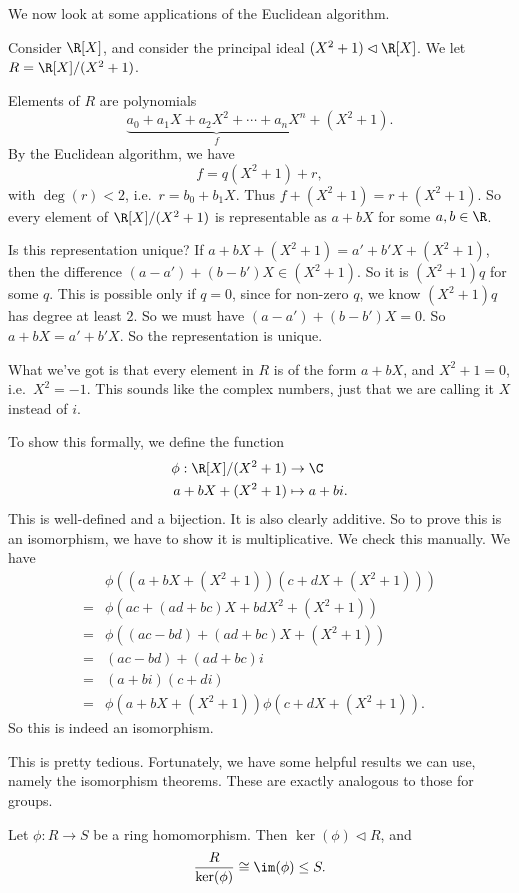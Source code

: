 \documentclass[a4paper]{article}
\begin{document}
We now look at some applications of the Euclidean algorithm.
\begin{eg}
  Consider $\R[X]$, and consider the principal ideal $(X^2 + 1) \lhd \R[X]$. We let $R = \R[X]/(X^2 + 1)$.

  Elements of $R$ are polynomials
  \[
    \underbrace{a_0 + a_1X + a_2 X^2 + \cdots + a_n X^n}_{f} + (X^2 + 1).
  \]
  By the Euclidean algorithm, we have
  \[
    f = q(X^2 + 1) + r,
  \]
  with $\deg(r) < 2$, i.e.\ $r = b_0 + b_1 X$. Thus $f + (X^2 + 1) = r + (X^2 + 1)$. So every element of $\R[X]/(X^2 + 1)$ is representable as $a + bX$ for some $a, b \in \R$.

  Is this representation unique? If $a + bX + (X^2 + 1) = a' + b' X + (X^2 + 1)$, then the difference $(a - a') + (b - b')X \in (X^2 + 1)$. So it is $(X^2 + 1)q$ for some $q$. This is possible only if $q = 0$, since for non-zero $q$, we know $(X^2 + 1)q$ has degree at least $2$. So we must have $(a - a') + (b - b')X = 0$. So $a + bX = a' + b'X$. So the representation is unique.

  What we've got is that every element in $R$ is of the form $a + bX$, and $X^2 + 1 = 0$, i.e.\ $X^2 = -1$. This sounds like the complex numbers, just that we are calling it $X$ instead of $i$.

  To show this formally, we define the function
  \begin{align*}
    \phi: \R[X]/(X^2 + 1) &\to \C\\
    a + bX + (X^2 + 1) & \mapsto a + bi.
  \end{align*}
  This is well-defined and a bijection. It is also clearly additive. So to prove this is an isomorphism, we have to show it is multiplicative. We check this manually. We have
  \begin{align*}
    &\phi((a + bX + (X^2 + 1))(c + dX + (X^2 + 1))) \\
    ={}& \phi(ac + (ad + bc)X + bdX^2 + (X^2 + 1))\\
    ={}& \phi((ac - bd) + (ad + bc)X + (X^2 + 1))\\
    ={}& (ac - bd) + (ad + bc)i\\
    ={}& (a + bi) (c + di)\\
    ={}& \phi(a + bX + (X^2 + 1))\phi(c + dX + (X^2 + 1)).
  \end{align*}
  So this is indeed an isomorphism.
\end{eg}

This is pretty tedious. Fortunately, we have some helpful results we can use, namely the isomorphism theorems. These are exactly analogous to those for groups.
\begin{thm}
  Let $\phi: R \to S$ be a ring homomorphism. Then $\ker (\phi) \lhd R$, and
  \[
    \frac{R}{\ker (\phi)} \cong \im(\phi) \leq S.
  \]
\end{thm}
\end{document}

